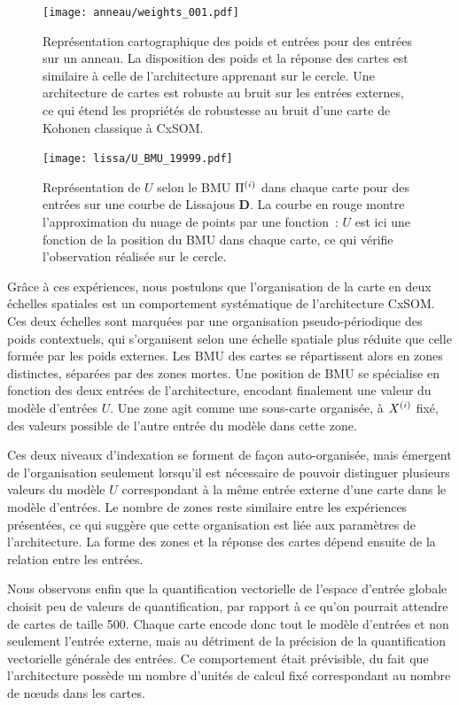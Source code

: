 \documentclass[../main]{subfiles}
\begin{document}
\begin{figure}
\begin{minipage}{\textwidth}
	\centering\texttt{[image: anneau/weights\_001.pdf]}
	\caption{Représentation cartographique des poids et entrées pour des entrées sur un anneau. La disposition des poids et la réponse des cartes est similaire à celle de l'architecture apprenant sur le cercle. Une architecture de cartes est robuste au bruit sur les entrées externes, ce qui étend les propriétés de robustesse au bruit d'une carte de Kohonen classique à CxSOM. \label{fig:anneau_w}}
\end{minipage}
\end{figure}

\begin{figure}[t]
	\centering\texttt{[image: lissa/U\_BMU\_19999.pdf]}
	\caption{Représentation de $U$ selon le BMU $\Pi^{({i})}$ dans chaque carte pour des entrées sur une courbe de Lissajous \textbf{D}. La courbe en rouge montre l'approximation du nuage de points par une fonction~: $U$ est ici une fonction de la position du BMU dans chaque carte, ce qui vérifie l'observation réalisée sur le cercle.\label{fig:u_bmu_lissa}}
\end{figure}


Grâce à ces expériences, nous postulons que l'organisation de la carte en deux échelles spatiales est un comportement systématique de l'architecture CxSOM. 
Ces deux échelles sont marquées par une organisation pseudo-périodique des poids contextuels, qui s'organisent selon une échelle spatiale plus réduite que celle formée par les poids externes. Les BMU des cartes se répartissent alors en zones distinctes, séparées par des zones mortes.
Une position de BMU se spécialise en fonction des deux entrées de l'architecture, encodant finalement une valeur du modèle d'entrées $U$. 
Une zone agit comme une sous-carte organisée, à $X^{({i})}$ fixé, des valeurs possible de l'autre entrée du modèle dans cette zone.

Ces deux niveaux d'indexation se forment de façon auto-organisée, mais émergent de l'organisation seulement lorsqu'il est nécessaire de pouvoir distinguer plusieurs valeurs du modèle $U$ correspondant à la même entrée externe d'une carte dans le modèle d'entrées.
Le nombre de zones reste similaire entre les expériences présentées, ce qui suggère que cette organisation est liée aux paramètres de l'architecture. La forme des zones et la réponse des cartes dépend ensuite de la relation entre les entrées.

Nous observons enfin que la quantification vectorielle de l'espace d'entrée globale choisit peu de valeurs de quantification, par rapport à ce qu'on pourrait attendre de cartes de taille 500.
Chaque carte encode donc tout le modèle d'entrées et non seulement l'entrée externe, mais au détriment de la précision de la quantification vectorielle générale des entrées. 
Ce comportement était prévisible, du fait que l'architecture possède un nombre d'unités de calcul fixé correspondant au nombre de n\oe{}uds dans les cartes.
\end{document}
